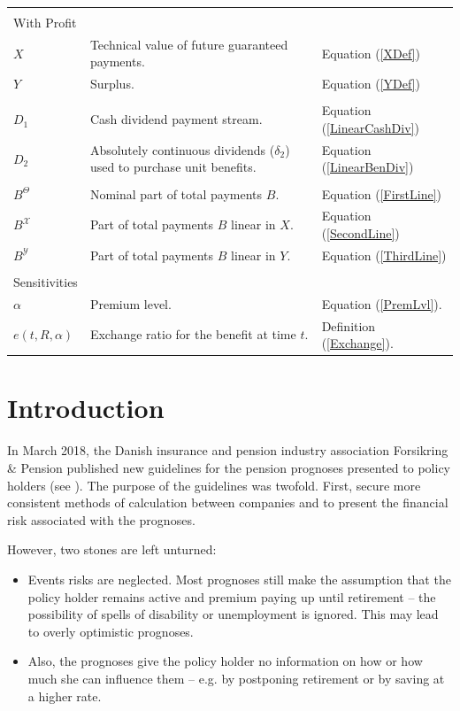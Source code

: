 \documentclass{article}
\newcommand{\1}[1]{\mathbbm{1}_{\left\lbrace #1 \right\rbrace}}
\theoremstyle{break}
\theoremstyle{remark}
\numberwithin{equation}{section}
\begin{document}
\begin{table}[H]
\begin{tabular}{lll}
		&&\\
		With Profit&&\\
		\hline
		$X$& Technical value of future guaranteed payments. & Equation (\ref{XDef})\\
		$Y$& Surplus. & Equation (\ref{YDef}) \\
		&&\\
		$D_1$& Cash dividend payment stream. & Equation (\ref{LinearCashDiv})\\
		$D_2$& Absolutely continuous dividends ($\delta_2$) used to purchase unit benefits. & Equation (\ref{LinearBenDiv}) \\
		&&\\
		$B^\Theta$& Nominal part of total payments $B$. & Equation (\ref{FirstLine}) \\
		$B^\mathcal{X}$& Part of total payments $B$ linear in $X$. & Equation (\ref{SecondLine})\\
		$B^\mathcal{Y}$& Part of total payments $B$ linear in $Y$. & Equation (\ref{ThirdLine}) \\
		&&\\
		Sensitivities&&\\
		\hline
		$\alpha$& Premium level. & Equation (\ref{PremLvl}). \\
		$e(t,R,\alpha)$& Exchange ratio for the benefit at time $t$. & Definition (\ref{Exchange}).
	\end{tabular}
\end{table}

\newpage

\section{Introduction}

In March 2018, the Danish insurance and pension industry association Forsikring \& Pension published new guidelines for the pension prognoses presented to policy holders (see \cite{Henstilling}). The purpose of the guidelines was twofold. First, secure more consistent methods of calculation between companies and to present the financial risk associated with the prognoses.

However, two stones are left unturned:

\begin{itemize}
	\item Events risks are neglected. Most prognoses still make the assumption that the policy holder remains active and premium paying up until retirement -- the possibility of spells of disability or unemployment is ignored. This may lead to overly optimistic prognoses.
	\item Also, the prognoses give the policy holder no information on how or how much she can influence them -- e.g. by postponing retirement or by saving at a higher rate.
\end{itemize}
\end{document}
